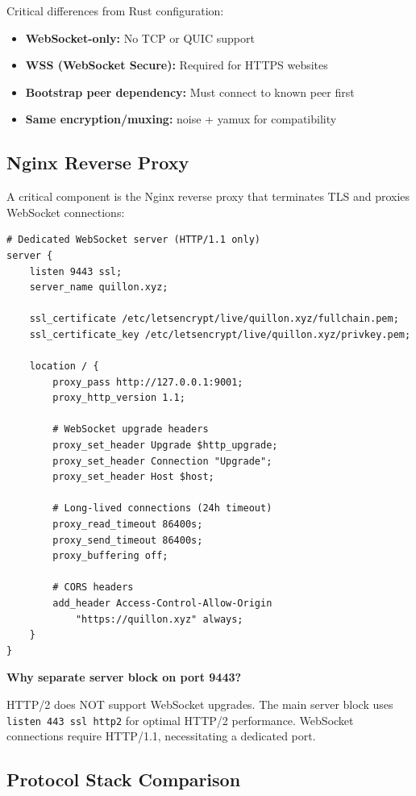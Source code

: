 \documentclass[11pt,a4paper]{article}
\begin{document}
Critical differences from Rust configuration:

\begin{itemize}
    \item \textbf{WebSocket-only:} No TCP or QUIC support
    \item \textbf{WSS (WebSocket Secure):} Required for HTTPS websites
    \item \textbf{Bootstrap peer dependency:} Must connect to known peer first
    \item \textbf{Same encryption/muxing:} noise + yamux for compatibility
\end{itemize}

\subsection{Nginx Reverse Proxy}

A critical component is the Nginx reverse proxy that terminates TLS and proxies WebSocket connections:

\begin{lstlisting}[caption=Nginx WebSocket Proxy Configuration]
# Dedicated WebSocket server (HTTP/1.1 only)
server {
    listen 9443 ssl;
    server_name quillon.xyz;

    ssl_certificate /etc/letsencrypt/live/quillon.xyz/fullchain.pem;
    ssl_certificate_key /etc/letsencrypt/live/quillon.xyz/privkey.pem;

    location / {
        proxy_pass http://127.0.0.1:9001;
        proxy_http_version 1.1;

        # WebSocket upgrade headers
        proxy_set_header Upgrade $http_upgrade;
        proxy_set_header Connection "Upgrade";
        proxy_set_header Host $host;

        # Long-lived connections (24h timeout)
        proxy_read_timeout 86400s;
        proxy_send_timeout 86400s;
        proxy_buffering off;

        # CORS headers
        add_header Access-Control-Allow-Origin
            "https://quillon.xyz" always;
    }
}
\end{lstlisting}

\textbf{Why separate server block on port 9443?}

HTTP/2 does NOT support WebSocket upgrades. The main server block uses \texttt{listen 443 ssl http2} for optimal HTTP/2 performance. WebSocket connections require HTTP/1.1, necessitating a dedicated port.

\subsection{Protocol Stack Comparison}
\end{document}
